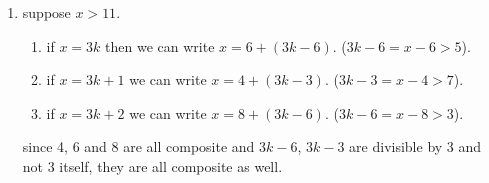 \begin{enumerate}[label=]
    \item 
        suppose $x > 11$. 
        \begin{enumerate}
            \item 
                if $x = 3k$ then we can write $x = 6 + (3k - 6)$. ($3k-6 = x - 6 > 5$).
            \item 
                if $x = 3k + 1$ we can write $x = 4 + (3k - 3)$. ($3k - 3 = x - 4 > 7$).
            \item  
                if $x = 3k + 2$ we can write $x = 8 + (3k -6)$. ($3k - 6 = x - 8 > 3$).
        \end{enumerate} 
        since 4, 6 and 8 are all composite and $3k - 6$, $3k - 3$ are divisible by 3 and not 3 itself, they are all composite as well.
\end{enumerate}